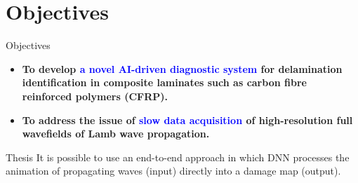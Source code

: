 \documentclass[10pt,aspectratio=169,dvipsnames]{beamer} %
\begin{document}
\section{Objectives}
\begin{frame}{Objectives}
	\begin{itemize}
		\item \textbf{To develop \textcolor{blue}{a novel AI-driven diagnostic system} for delamination identification in composite laminates such as carbon fibre reinforced polymers (CFRP).}
		\item \textbf{To address the issue of \textcolor{blue}{slow data acquisition} of high-resolution full wavefields of Lamb wave propagation.}
	\end{itemize}
	\begin{alertblock}{Thesis}
		It is possible to use an end-to-end approach in which DNN 
		processes the animation of propagating waves (input) directly into a damage map (output).
	\end{alertblock}
\end{frame}
%
\end{document}
